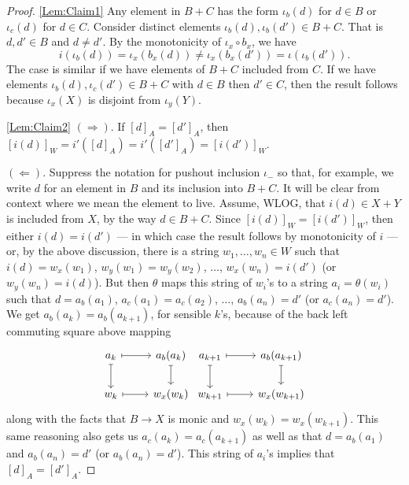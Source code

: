 \documentclass[12pt]{article}
\renewcommand{\(}{\left(}
\renewcommand{\)}{\right)}
\renewcommand{\{}{\left\lbrace}
\renewcommand{\}}{\right\rbrace}
\theoremstyle{remark}
\theoremstyle{definition}
\begin{document}
\begin{proof}
	\ref{Lem:Claim1} Any element in $B+C$ has the form $\iota_{b}(d)$ for $d\in B$ or $\iota_c(d)$ for $d \in C$. Consider distinct elements $\iota_b (d), \iota_b (d') \in B+C$. That is $d, d' \in B$ and $d \neq d'$. By the monotonicity of $\iota_x \circ b_x$, we have 
	\[
		i ( \iota_b (d)) 
			= \iota_x (b_x(d)) 
			\neq \iota_x (b_x(d'))
			= \iota ( \iota_b (d')).
	\]   
	The case is similar if we have elements of $B+C$ included from $C$.  If we have elements $\iota_b(d), \iota_c (d') \in B+C$ with $d \in B$ then $d' \in C$, then the result follows because $\iota_x (X)$ is disjoint from $\iota_y (Y)$.    
	
	\ref{Lem:Claim2} $(\Rightarrow)$. If $[d]_A = [d']_A$, then $[i(d)]_W=i'([d]_A) = i'([d']_A)=[i(d')]_W$.
	
	$(\Leftarrow)$. Suppress the notation for pushout inclusion $\iota_{-}$ so that, for example, we write $d$ for an element in $B$ and its inclusion into $B+C$. It will be clear from context where we mean the element to live. Assume, WLOG, that $i(d) \in X+Y$ is included from $X$, by the way $d \in B+C$.  Since $[i(d)]_W=[i(d')]_W$, then either $i(d)=i(d')$ --- in which case the result follows by monotonicity of $i$ --- or, by the above discussion, there is a string $w_1, \dotsc, w_n \in W$ such that $i(d)=w_x(w_1)$, $w_y(w_1)=w_y(w_2)$, $\dotsc$, $w_x(w_n)=i(d')$ (or $w_y(w_n)=i(d)$). But then $\theta$ maps this string of $w_i$'s to a string $a_i = \theta (w_i)$ such that $d=a_b(a_1)$, $a_c(a_1)=a_c(a_2)$, $\dotsc$, $a_b(a_n)=d'$ (or $a_c(a_n)=d'$). We get $a_b(a_k)=a_b(a_{k+1})$, for sensible $k$'s, because of the back left commuting square above mapping
	\[
		\begin{tikzcd}
			{a_k} 
				\arrow[r,mapsto]
				\arrow[d,mapsto] &
			{a_b(a_k)} 
				\arrow[d,mapsto] \\
			{w_k} 
				\arrow[r,mapsto] &
			{w_x(w_k)}
		\end{tikzcd}
		\begin{tikzcd}
			{a_{k+1}} 
				\arrow[r,mapsto]
				\arrow[d,mapsto] &
			{a_b(a_{k+1})} 
				\arrow[d,mapsto] \\
			{w_{k+1}} 
				\arrow[r,mapsto] &
			{w_x(w_{k+1})}
		\end{tikzcd}
	\]
	along with the facts that $B \to X$ is monic and $w_x(w_k)=w_x(w_{k+1})$. This same reasoning also gets us $a_c(a_k)=a_c(a_{k+1})$ as well as that $d=a_b(a_1)$ and $a_b(a_n)=d'$ (or $a_b(a_n)=d'$). This string of $a_i$'s implies that $[d]_A=[d']_A$.
\end{proof}
\end{document}
